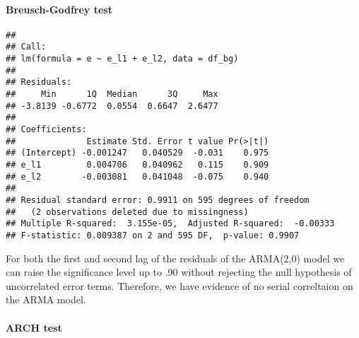 \documentclass[]{article}
\newenvironment{Shaded}{\begin{snugshade}}{\end{snugshade}}
\newcommand{\AttributeTok}[1]{\textcolor[rgb]{0.77,0.63,0.00}{#1}}
\newcommand{\DecValTok}[1]{\textcolor[rgb]{0.00,0.00,0.81}{#1}}
\newcommand{\FunctionTok}[1]{\textcolor[rgb]{0.00,0.00,0.00}{#1}}
\newcommand{\NormalTok}[1]{#1}
\newcommand{\OtherTok}[1]{\textcolor[rgb]{0.56,0.35,0.01}{#1}}
\newcommand{\SpecialCharTok}[1]{\textcolor[rgb]{0.00,0.00,0.00}{#1}}
\newcommand{\StringTok}[1]{\textcolor[rgb]{0.31,0.60,0.02}{#1}}
\let\oldparagraph\paragraph
\renewcommand{\paragraph}[1]{\oldparagraph{#1}\mbox{}}
\begin{document}
\hypertarget{breusch-godfrey-test}{%
\paragraph{Breusch-Godfrey test}\label{breusch-godfrey-test}}

\begin{Shaded}
\end{Shaded}

\begin{verbatim}
## 
## Call:
## lm(formula = e ~ e_l1 + e_l2, data = df_bg)
## 
## Residuals:
##     Min      1Q  Median      3Q     Max 
## -3.8139 -0.6772  0.0554  0.6647  2.6477 
## 
## Coefficients:
##              Estimate Std. Error t value Pr(>|t|)
## (Intercept) -0.001247   0.040529  -0.031    0.975
## e_l1         0.004706   0.040962   0.115    0.909
## e_l2        -0.003081   0.041048  -0.075    0.940
## 
## Residual standard error: 0.9911 on 595 degrees of freedom
##   (2 observations deleted due to missingness)
## Multiple R-squared:  3.155e-05,  Adjusted R-squared:  -0.00333 
## F-statistic: 0.009387 on 2 and 595 DF,  p-value: 0.9907
\end{verbatim}

For both the first and second lag of the residuals of the ARMA(2,0)
model we can raise the significance level up to .90 without rejecting
the null hypothesis of uncorrelated error terms. Therefore, we have
evidence of no serial correltaion on the ARMA model.

\hypertarget{arch-test}{%
\paragraph{ARCH test}\label{arch-test}}
\end{document}
